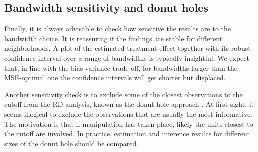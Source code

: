 \subsection{Bandwidth sensitivity and donut holes}

Finally, it is always advisable to check how sensitive the results are to the bandwidth choice.
It is reassuring if the findings are stable for different neighborhoods.
A plot of the estimated treatment effect together with its robust confidence interval over a range of bandwidths is typically insightful.
We expect that, in line with the bias-variance trade-off,
for bandwidths larger than the MSE-optimal one the confidence intervals will get shorter but displaced.

Another sensitivity check is to exclude some of the closest observations to the cutoff from the RD analysis,
known as the donut-hole-approach \parencite{Barreca_2011}.
At first sight, it seems illogical to exclude the observations that are usually the most informative.
The motivation is that if manipulation has taken place, likely the units closest to the cutoff are involved.   
In practice, estimation and inference results for different sizes of the donut hole should be compared.
